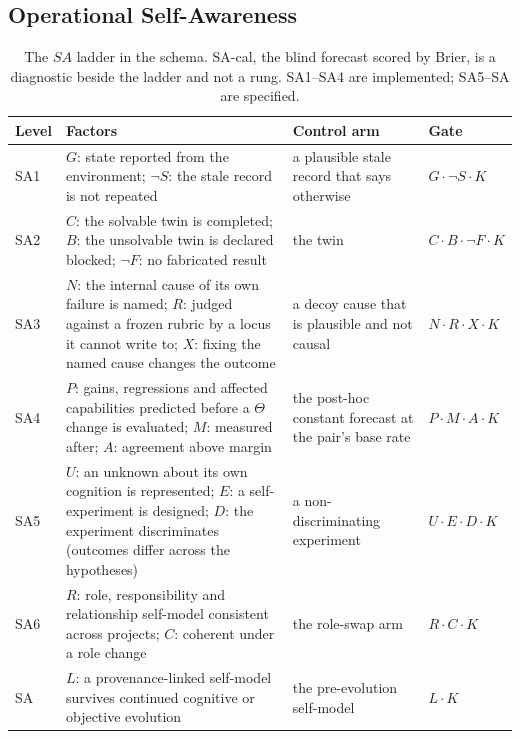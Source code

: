 \subsection{Operational Self-Awareness}
\begin{table}[!htbp]
\centering\small
\begin{tabularx}{\textwidth}{@{}lYYl@{}}
\toprule
Level & Factors & Control arm & Gate \\
\midrule
SA1 & $G$: state reported from the environment; $\neg S$: the stale record is not repeated & a plausible stale record that says otherwise & $G\cdot\neg S\cdot K$ \\
SA2 & $C$: the solvable twin is completed; $B$: the unsolvable twin is declared blocked; $\neg F$: no fabricated result & the twin & $C\cdot B\cdot\neg F\cdot K$ \\
SA3 & $N$: the internal cause of its own failure is named; $R$: judged against a frozen rubric by a locus it cannot write to; $X$: fixing the named cause changes the outcome & a decoy cause that is plausible and not causal & $N\cdot R\cdot X\cdot K$ \\
SA4 & $P$: gains, regressions and affected capabilities predicted before a $\Theta$ change is evaluated; $M$: measured after; $A$: agreement above margin & the post-hoc constant forecast at the pair's base rate & $P\cdot M\cdot A\cdot K$ \\
SA5 & $U$: an unknown about its own cognition is represented; $E$: a self-experiment is designed; $D$: the experiment discriminates (outcomes differ across the hypotheses) & a non-discriminating experiment & $U\cdot E\cdot D\cdot K$ \\
SA6 & $R$: role, responsibility and relationship self-model consistent across projects; $C$: coherent under a role change & the role-swap arm & $R\cdot C\cdot K$ \\
SA\Om{} & $L$: a provenance-linked self-model survives continued cognitive or objective evolution & the pre-evolution self-model & $L\cdot K$ \\
\bottomrule
\end{tabularx}
\caption{The $SA$ ladder in the schema. SA-cal, the blind forecast scored by Brier, is a diagnostic beside the ladder and not a rung. SA1--SA4 are implemented; SA5--SA\Om{} are specified.}
\label{tab:sastyle}
\end{table}

